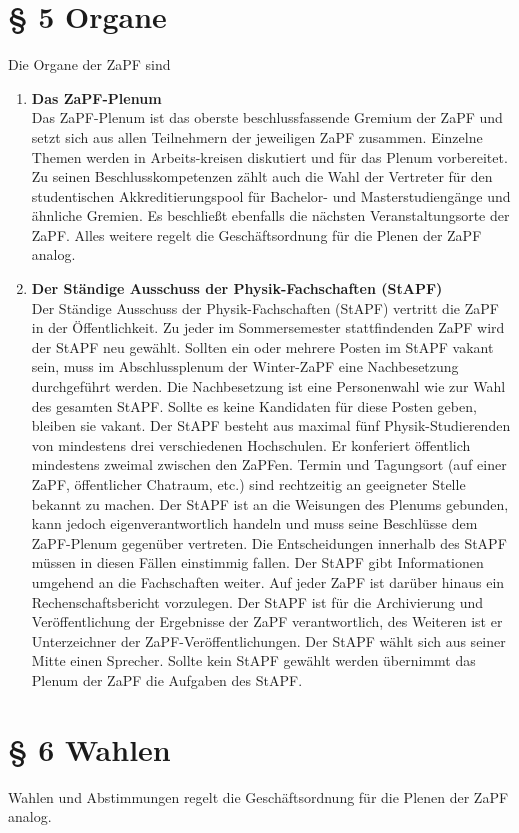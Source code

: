 \section*{§ 5 Organe}
Die Organe der ZaPF sind
\begin{enumerate}
\item{\textbf{Das ZaPF-Plenum}\\
Das ZaPF-Plenum ist das oberste beschlussfassende Gremium der ZaPF und setzt sich aus allen Teilnehmern der jeweiligen ZaPF
zusammen. Einzelne Themen werden in Arbeits-kreisen diskutiert und für das Plenum vorbereitet. Zu seinen Beschlusskompetenzen
zählt auch die Wahl der Vertreter für den studentischen Akkreditierungspool für Bachelor- und Masterstudiengänge und ähnliche
Gremien. Es beschließt ebenfalls die nächsten Veranstaltungsorte der ZaPF. Alles weitere regelt die Geschäftsordnung für die Plenen der
ZaPF analog.}
\item{\textbf{Der Ständige Ausschuss der Physik-Fachschaften (StAPF)}\\
Der Ständige Ausschuss der Physik-Fachschaften (StAPF) vertritt die ZaPF in der Öffentlichkeit. Zu jeder im
Sommersemester stattfindenden ZaPF wird der StAPF neu gewählt. Sollten ein oder mehrere Posten im StAPF vakant sein,
muss im Abschlussplenum der Winter-ZaPF eine Nachbesetzung durchgeführt werden. Die Nachbesetzung ist eine Personenwahl
wie zur Wahl des gesamten StAPF. Sollte es keine Kandidaten für diese Posten geben, bleiben sie vakant. Der StAPF
besteht aus maximal fünf Physik-Studierenden von mindestens drei verschiedenen Hochschulen. Er konferiert öffentlich
mindestens zweimal zwischen den ZaPFen. Termin und Tagungsort (auf einer ZaPF, öffentlicher Chatraum, etc.) sind
rechtzeitig an geeigneter Stelle bekannt zu machen. Der StAPF ist an die Weisungen des Plenums gebunden, kann jedoch
eigenverantwortlich handeln und muss seine Beschlüsse dem ZaPF-Plenum gegenüber vertreten. Die Entscheidungen innerhalb
des StAPF müssen in diesen Fällen einstimmig fallen. Der StAPF gibt Informationen umgehend an die Fachschaften weiter.
Auf jeder ZaPF ist darüber hinaus ein Rechenschaftsbericht vorzulegen. Der StAPF ist für die Archivierung und
Veröffentlichung der Ergebnisse der ZaPF verantwortlich, des Weiteren ist er Unterzeichner der ZaPF-Veröffentlichungen.
Der StAPF wählt sich aus seiner Mitte einen Sprecher. Sollte kein StAPF gewählt werden übernimmt das Plenum der ZaPF
die Aufgaben des StAPF.}
\end{enumerate}
\section*{§ 6 Wahlen}
Wahlen und Abstimmungen regelt die Geschäftsordnung für die Plenen der ZaPF analog.

